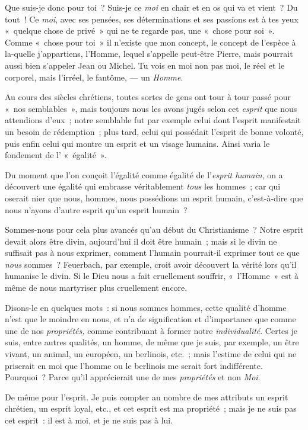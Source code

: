 \documentclass[french,twoside]{book} %
\begin{document}
Que suis-je donc pour toi ? Suis-je ce \emph{moi} en chair et en os qui va et vient ? Du tout ! Ce \emph{moi}, avec ses pensées, ses déterminations et ses passions est à tes yeux « quelque chose de privé » qui ne te regarde pas, une « chose pour soi ». Comme « chose pour toi » il n’existe que mon concept, le concept de l’espèce à la-quelle j’appartiens, l’Homme, lequel s’appelle peut-être Pierre, mais pourrait aussi bien s’appeler Jean ou Michel. Tu vois en moi non pas moi, le réel et le corporel, mais l’irréel, le fantôme, — un \emph{Homme}.\par
Au cours des siècles chrétiens, toutes sortes de gens ont tour à tour passé pour « nos semblables », mais toujours nous les avons jugés selon cet \emph{esprit} que  nous attendions d’eux ; notre semblable fut par exemple celui dont l’esprit manifestait un besoin de rédemption ; plus tard, celui qui possédait l’esprit de bonne volonté, puis enfin celui qui montre un esprit et un visage humains. Ainsi varia le fondement de l’ « égalité ».\par
Du moment que l’on conçoit l’égalité comme égalité de l’\emph{esprit humain}, on a découvert une égalité qui embrasse véritablement \emph{tous} les hommes ; car qui oserait nier que nous, hommes, nous possédions un esprit humain, c’est-à-dire que nous n’ayons d’autre esprit qu’un esprit humain ?\par
Sommes-nous pour cela plus avancés qu’au début du Christianisme ? Notre esprit devait alors être divin, aujourd’hui il doit être humain ; mais si le divin ne suffisait pas à nous exprimer, comment l’humain pourrait-il exprimer tout ce que \emph{nous} sommes ? Feuerbach, par exemple, croit avoir découvert la vérité lors qu’il humanise le divin. Si le Dieu nous a fait cruellement souffrir, « l’Homme » est à même de nous martyriser plus cruellement encore.\par
Disons-le en quelques mots : si nous sommes hommes, cette qualité d’homme n’est que le moindre en nous, et n’a de signification et d’importance que comme une de nos \emph{propriétés,} comme contribuant à former notre \emph{individualité}. Certes je suis, entre autres qualités, un homme, de même que je suis, par exemple, un être vivant, un animal, un européen, un berlinois, etc. ; mais l’estime de celui qui ne priserait en moi que l’homme ou le berlinois me serait fort indifférente. Pourquoi ? Parce qu’il apprécierait une de mes \emph{propriétés} et non \emph{Moi}.\par
De même pour l’esprit. Je puis compter au nombre de mes attributs un esprit chrétien, un esprit loyal, etc., et cet esprit est ma propriété ; mais je ne suis pas cet esprit : il est à moi, et je ne suis pas à lui.\par
\end{document}
